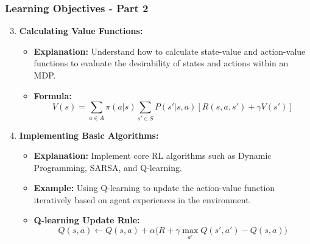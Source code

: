 \documentclass{beamer}
\begin{document}
\begin{frame}[fragile]
    \frametitle{Learning Objectives - Part 2}
    \begin{enumerate}
        \setcounter{enumi}{2} %
        \item \textbf{Calculating Value Functions:}
            \begin{itemize}
                \item \textbf{Explanation:} Understand how to calculate state-value and action-value functions to evaluate the desirability of states and actions within an MDP.
                \item \textbf{Formula:}
                \begin{equation}
                    V(s) = \sum_{a \in A} \pi(a|s) \sum_{s' \in S} P(s'|s,a)[R(s,a,s') + \gamma V(s')]
                \end{equation}
            \end{itemize}

        \item \textbf{Implementing Basic Algorithms:}
            \begin{itemize}
                \item \textbf{Explanation:} Implement core RL algorithms such as Dynamic Programming, SARSA, and Q-learning.
                \item \textbf{Example:} Using Q-learning to update the action-value function iteratively based on agent experiences in the environment.
                \item \textbf{Q-learning Update Rule:}
                \begin{equation}
                    Q(s, a) \leftarrow Q(s, a) + \alpha \Big(R + \gamma \max_{a'} Q(s', a') - Q(s, a)\Big)
                \end{equation}
            \end{itemize}
    \end{enumerate}
\end{frame}
\end{document}
